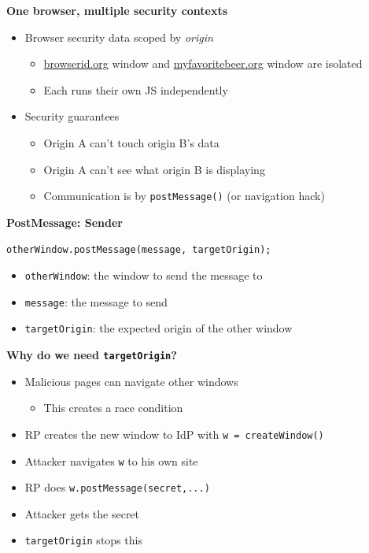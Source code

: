 \documentclass[helvetica]{seminar}
\newcommand{\heading}[1]{%
  \begin{center} 
    \large\bf 
    #1 
  \end{center} 
  \vspace{.4 in}}
\begin{document}
\begin{slide}
\heading{One browser, multiple security contexts}

\begin{itemize}
\item Browser security data scoped by \emph{origin}
  \begin{itemize}
  \item \url{browserid.org} window and \url{myfavoritebeer.org} window are isolated
  \item Each runs their own JS independently
  \end{itemize}

\item Security guarantees
  \begin{itemize}
  \item Origin A can't touch origin B's data
  \item Origin A can't see what origin B is displaying
  \item Communication is by \verb^postMessage()^ (or navigation hack)
  \end{itemize}
\end{itemize}
\end{slide}


\begin{slide}
\heading{PostMessage: Sender}

\verb^otherWindow.postMessage(message, targetOrigin);^

\begin{itemize}
\item[] \verb^otherWindow^: the window to send the message to
\item[] \verb^message^: the message to send
\item[] \verb^targetOrigin^: the expected origin of the other window
\end{itemize}
\end{slide}


\begin{slide}
\heading{Why do we need \texttt{targetOrigin}?}

\begin{itemize}
\item Malicious pages can navigate other windows
  \begin{itemize}
  \item This creates a race condition
  \end{itemize}

\item RP creates the new window to IdP with \verb^w = createWindow()^
\item Attacker navigates \verb^w^ to his own site
\item RP does \verb^w.postMessage(secret,...)^
\item Attacker gets the secret
\item \verb^targetOrigin^ stops this
\end{itemize}

\end{slide}
\end{document}

